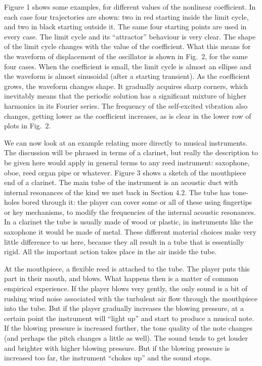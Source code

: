   Figure 1 shows some examples, for different values of the nonlinear 
  coefficient. In each case four trajectories are shown: two in red starting 
  inside the limit cycle, and two in black starting outside it. The same four 
  starting points are used in every case. The limit cycle and its ``attractor'' 
  behaviour is very clear. The shape of the limit cycle changes with the value 
  of the coefficient. What this means for the waveform of displacement of the 
  oscillator is shown in Fig.\ 2, for the same four cases. When the coefficient 
  is small, the limit cycle is almost an ellipse and the waveform is almost 
  sinusoidal (after a starting transient). As the coefficient grows, the 
  waveform changes shape. It gradually acquires sharp corners, which inevitably 
  means that the periodic solution has a significant mixture of higher 
  harmonics in its Fourier series. The frequency of the self-excited vibration 
  also changes, getting lower as the coefficient increases, as is clear in the 
  lower row of plots in Fig.\ 2. 

  We can now look at an example relating more directly to musical instruments. 
  The discussion will be phrased in terms of a clarinet, but really the 
  description to be given here would apply in general terms to any reed 
  instrument: saxophone, oboe, reed organ pipe or whatever. Figure 3 shows a 
  sketch of the mouthpiece end of a clarinet. The main tube of the instrument 
  is an acoustic duct with internal resonances of the kind we met back in 
  Section 4.2. The tube has tone-holes bored through it: the player can cover 
  some or all of these using fingertips or key mechanisms, to modify the 
  frequencies of the internal acoustic resonances. In a clarinet the tube is 
  usually made of wood or plastic, in instruments like the saxophone it would 
  be made of metal. These different material choices make very little 
  difference to us here, because they all result in a tube that is essentially 
  rigid. All the important action takes place in the air inside the tube. 

  At the mouthpiece, a flexible reed is attached to the tube. The player puts 
  this part in their mouth, and blows. What happens then is a matter of common 
  empirical experience. If the player blows very gently, the only sound is a 
  bit of rushing wind noise associated with the turbulent air flow through the 
  mouthpiece into the tube. But if the player gradually increases the blowing 
  pressure, at a certain point the instrument will “light up” and start to 
  produce a musical note. If the blowing pressure is increased further, the 
  tone quality of the note changes (and perhaps the pitch changes a little as 
  well). The sound tends to get louder and brighter with higher blowing 
  pressure. But if the blowing pressure is increased too far, the instrument 
  “chokes up” and the sound stops. 


